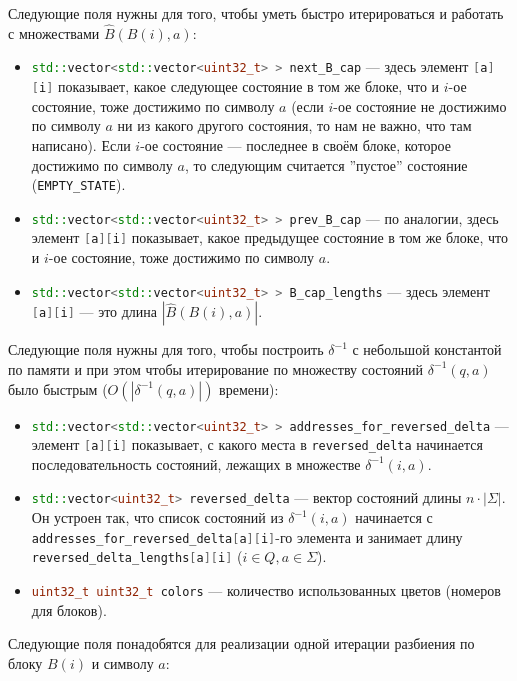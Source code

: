 \documentclass{article}
\begin{document}
Следующие поля нужны для того, чтобы уметь быстро итерироваться и работать с множествами $\hat B(B(i), a)$:
\begin{itemize}
  \item \lstinline[language=C++]!std::vector<std::vector<uint32_t> > next_B_cap! --- здесь элемент \lstinline[language=C++]![a][i]! показывает, какое следующее состояние в том же блоке, что и $i$-ое состояние, тоже достижимо по символу $a$ (если $i$-ое состояние не достижимо по символу $a$ ни из какого другого состояния, то нам не важно, что там написано). Если $i$-ое состояние --- последнее в своём блоке, которое достижимо по символу $a$, то следующим считается ''пустое'' состояние (\lstinline[language=C++]!EMPTY_STATE!).
  \item \lstinline[language=C++]!std::vector<std::vector<uint32_t> > prev_B_cap! --- по аналогии, здесь элемент \lstinline[language=C++]![a][i]! показывает, какое предыдущее состояние в том же блоке, что и $i$-ое состояние, тоже достижимо по символу $a$.
  \item \lstinline[language=C++]!std::vector<std::vector<uint32_t> > B_cap_lengths! --- здесь элемент \lstinline[language=C++]![a][i]! --- это длина $|\hat B(B(i), a)|$.
\end{itemize}
Следующие поля нужны для того, чтобы построить $\delta^{-1}$ с небольшой константой по памяти и при этом чтобы итерирование по множеству состояний $\delta^{-1}(q, a)$ было быстрым ($O(|\delta^{-1}(q, a)|)$ времени):
\begin{itemize}
  \item \lstinline[language=C++]!std::vector<std::vector<uint32_t> > addresses_for_reversed_delta! --- элемент \lstinline[language=C++]![a][i]! показывает, с какого места в \lstinline[language=C++]!reversed_delta! начинается последовательность состояний, лежащих в множестве $\delta^{-1}(i, a)$.
  \item \lstinline[language=C++]!std::vector<uint32_t> reversed_delta! --- вектор состояний длины $n \cdot |\Sigma|$. Он устроен так, что список состояний из $\delta^{-1}(i, a)$ начинается с \lstinline[language=C++]!addresses_for_reversed_delta[a][i]!-го элемента и занимает длину \lstinline[language=C++]!reversed_delta_lengths[a][i]! ($i \in Q, a \in \Sigma$).
  \item \lstinline[language=C++]!uint32_t uint32_t colors! --- количество использованных цветов (номеров для блоков).
\end{itemize}
Следующие поля понадобятся для реализации одной итерации разбиения по блоку $B(i)$ и символу $a$:
\end{document}
